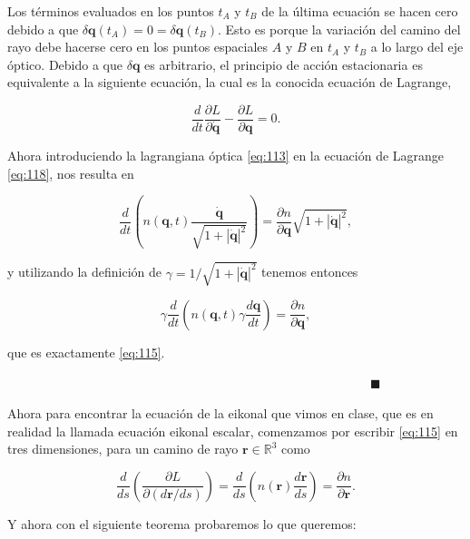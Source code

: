\documentclass[a4paper,10pt]{article}
\numberwithin{equation}{section}
\begin{document}
Los términos evaluados en los puntos $t_A$ y $t_B$ de la última ecuación se hacen cero 
debido a que $\delta\mathbf{q}(t_A) = 0 = \delta\mathbf{q}(t_B)$. Esto es porque 
la variación del camino del rayo debe hacerse cero en los puntos espaciales 
$A$ y $B$ en $t_A$ y $t_B$ a lo largo del eje óptico. Debido a que $\delta\mathbf{q}$ 
es arbitrario, el principio de acción estacionaria es equivalente a la siguiente ecuación, 
la cual es la conocida ecuación de Lagrange, 

\begin{equation}
 \frac{d}{dt}\frac{\partial L}{\partial \dot{\mathbf{q}}} - \frac{\partial L}{\partial \mathbf{q}} = 0.
\label{eq:118}
\end{equation}

Ahora introduciendo la lagrangiana óptica \eqref{eq:113} en la ecuación de Lagrange 
\eqref{eq:118}, nos resulta en 

\begin{equation}
 \frac{d}{dt}\left(n(\mathbf{q},t) \frac{\dot{\mathbf{q}}}{\sqrt{1 + |\dot{\mathbf{q}}|^2}}
 \right) = \frac{\partial n}{\partial \mathbf{q}} \sqrt{1 + |\dot{\mathbf{q}}|^2}, 
\end{equation}

y utilizando la definición de $\gamma = 1/\sqrt{1 + |\dot{\mathbf{q}}|^2}$ tenemos 
entonces 

\begin{equation}
 \gamma\frac{d}{dt}\left(n(\mathbf{q},t)\gamma\frac{d\mathbf{q}}{dt}\right) 
 = \frac{\partial n}{\partial \mathbf{q}},
\end{equation}

que es exactamente \eqref{eq:115}. 

$\hspace{12cm} \blacksquare$

Ahora para encontrar la ecuación de la eikonal 
que vimos en clase, que es en realidad la llamada ecuación eikonal escalar, comenzamos 
por escribir \eqref{eq:115} en tres dimensiones, para un camino de rayo $\mathbf{r} 
\in \mathbb{R}^3$ como 

\begin{equation}
 \frac{d}{ds}\left(\frac{\partial L}{\partial (d\mathbf{r}/ds)}\right) = 
 \frac{d}{ds}\left(n(\mathbf{r})\frac{d\mathbf{r}}{ds}\right) = 
 \frac{\partial n}{\partial \mathbf{r}}.
 \label{eq:119}
\end{equation}

Y ahora con el siguiente teorema probaremos lo que queremos:
\end{document}
